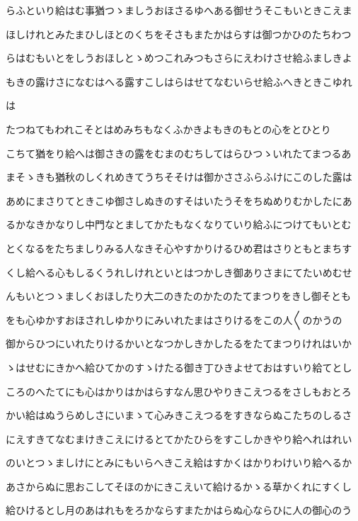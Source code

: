 \documentclass[a4paper,11pt,landscape]{ltjtarticle}
\begin{document}
\par\medskip
らふといり給はむ事猶つゝましうおほさるゆへある御せうそこもいときこえま
\par\medskip
ほしけれとみたまひしほとのくちをそさもまたかはらすは御つかひのたちわつ
\par\medskip
らはむもいとをしうおほしとゝめつこれみつもさらにえわけさせ給ふましきよ
\par\medskip
もきの露けさになむはへる露すこしはらはせてなむいらせ給ふへきときこゆれ
\par\medskip
は
\par\medskip
たつねてもわれこそとはめみちもなくふかきよもきのもとの心をとひとり
\par\medskip
こちて猶をり給へは御さきの露をむまのむちしてはらひつゝいれたてまつるあ
\par\medskip
まそゝきも猶秋のしくれめきてうちそそけは御かささふらふけにこのした露は
\par\medskip
あめにまさりてときこゆ御さしぬきのすそはいたうそをちぬめりむかしたにあ
\par\medskip
るかなきかなりし中門なとましてかたもなくなりていり給ふにつけてもいとむ
\par\medskip
とくなるをたちましりみる人なきそ心やすかりけるひめ君はさりともとまちす
\par\medskip
くし給へる心もしるくうれしけれといとはつかしき御ありさまにてたいめむせ
\par\medskip
んもいとつゝましくおほしたり大二のきたのかたのたてまつりをきし御そとも
\par\medskip
をも心ゆかすおほされしゆかりにみいれたまはさりけるをこの人〱のかうの
\par\medskip
御からひつにいれたりけるかいとなつかしきかしたるをたてまつりけれはいか
\par\medskip
ゝはせむにきかへ給ひてかのすゝけたる御き丁ひきよせておはすいり給てとし
\par\medskip
ころのへたてにも心はかりはかはらすなん思ひやりきこえつるをさしもおとろ
\par\medskip
かい給はぬうらめしさにいまゝて心みきこえつるをすきならぬこたちのしるさ
\par\medskip
にえすきてなむまけきこえにけるとてかたひらをすこしかきやり給へれはれい
\par\medskip
のいとつゝましけにとみにもいらへきこえ給はすかくはかりわけいり給へるか
\par\medskip
あさからぬに思おこしてそほのかにきこえいて給けるかゝる草かくれにすくし
\par\medskip
給ひけるとし月のあはれもをろかならすまたかはらぬ心ならひに人の御心のう
\end{document}
